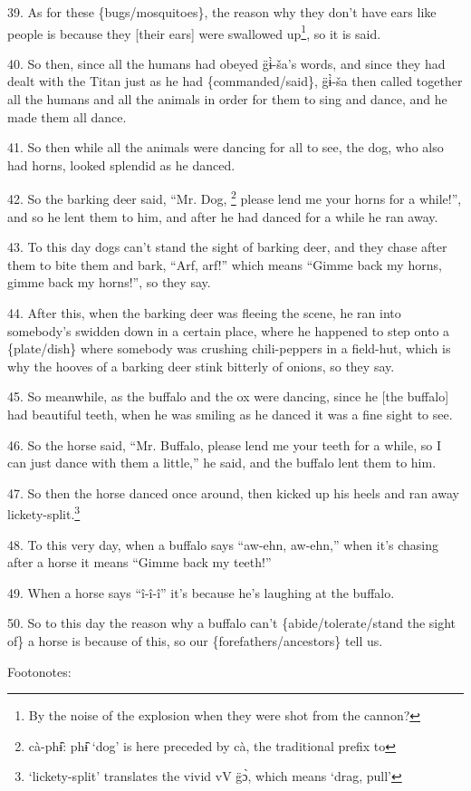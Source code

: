 39. As for these \{bugs/mosquitoes\}, the reason why they don't have ears like
people is because they [their ears] were swallowed up\footnote{By the noise of the explosion when they were shot from the cannon?}, so it is said.

40. So then, since all the humans had obeyed g̈ɨ̀-ša's words, and since they
had dealt with the Titan just as he had \{commanded/said\}, g̈ɨ̀-ša then called
together all the humans and all the animals in order for them to sing and dance,
and he made them all dance.

41. So then while all the animals were dancing for all to see, the dog, who also
had horns, looked splendid as he danced.

42. So the barking deer said, ``Mr. Dog, \footnote{cà-phɨ̂: phɨ̂ `dog' is here preceded by cà, the traditional prefix to} please lend me your horns for a while!'',
and so he lent them to him, and after he had danced for a while he ran away.

43. To this day dogs can't stand the sight of barking deer, and they chase after
them to bite them and bark, ``Arf, arf!'' which means ``Gimme back my horns, gimme
back my horns!'', so they say.

44. After this, when the barking deer was fleeing the scene, he ran into somebody's
swidden down in a certain place, where he happened to step onto a \{plate/dish\}
where somebody was crushing chili-peppers in a field-hut, which is why the hooves
of a barking deer stink bitterly of onions, so they say.

45. So meanwhile, as the buffalo and the ox were dancing, since he [the buffalo]
had beautiful teeth, when he was smiling as he danced it was a fine sight to see.

46. So the horse said, ``Mr. Buffalo, please lend me your teeth for a while, so
I can just dance with them a little,'' he said, and the buffalo lent them to him.

47. So then the horse danced once around, then kicked up his heels and ran away
lickety-split.\footnote{`lickety-split' translates the vivid vV g̈ɔ̀, which means `drag, pull'}

48. To this very day, when a buffalo says ``aw-ehn, aw-ehn,'' when it's chasing
after a horse it means ``Gimme back my teeth!''

49. When a horse says ``î-î-î'' it's because he's laughing at the buffalo.

50. So to this day the reason why a buffalo can't \{abide/tolerate/stand the sight
of\} a horse is because of this, so our \{forefathers/ancestors\} tell us.

Footonotes:

